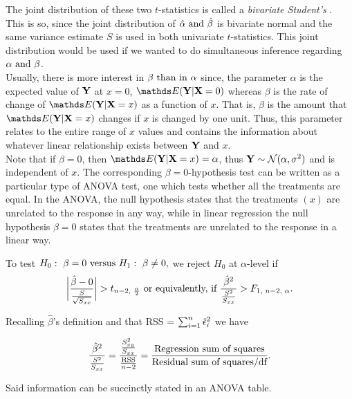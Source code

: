 \documentclass{homework}
\begin{document}
The joint distribution of these two $t$-statistics is called a \textit{bivariate Student's \tdis}. This is so, since the joint distribution of $\hat \alpha \textnormal{ and } \hat \beta$ is bivariate normal and the same variance estimate $S$ is used in both univariate $t$-statistics. This joint distribution would be used if we wanted to do simultaneous inference regarding $\alpha \textnormal{ and } \beta$. \\

Usually, there is more interest in $\beta \textnormal{ than in } \alpha$ since, the parameter $\alpha$ is the expected value of ${\bf Y}$ at $x = 0$, $\E(\Y | \X = 0)$ whereas $\beta$ is the rate of change of $\E(\Y | \X = x)$ as a function of $x$. That is, $\beta$ is the amount that $\E(\Y | \X = x)$ changes if $x$ is changed by one unit. Thus, this parameter relates to the entire range of $x$ values and contains the information about whatever linear relationship exists between ${\bf Y}$ and $x$. \\

Note that if $\beta = 0$, then $\E(\Y | \X = x) = \alpha$, thus ${\bf Y} \sim \mathcal{N}(\alpha, \sigma^2)$ and is independent of $x$. The corresponding $\beta = 0$-hypothesis test can be written as a particular type of ANOVA test, one which tests whether all the treatments are equal. In the ANOVA, the null hypothesis states that the treatments $(x)$ are unrelated to the response in any way, while in linear regression the null hypothesis $\beta = 0$ states that the treatments are unrelated to the response in a linear way. 

To test $H_0: \textnormal{ } \beta = 0 \textnormal{ versus } H_1: \textnormal{ } \beta \neq 0, $ we reject $H_0$ at $\alpha$-level if 
\begin{align*}
\bigg|\frac{\hat{\beta} - 0}{\frac{S}{\sqrt{S_{xx}}}}\bigg| > t_{n-2, \textnormal{ } \frac{\alpha}{2}} \textnormal{ or equivalently, if } \frac{\hat{\beta}^2}{\frac{S^2}{S_{xx}}} > F_{1, \textnormal{ } n-2, \textnormal{ } \alpha}.
\end{align*}

Recalling $\hat{\beta}$'s definition and that RSS = $\sum_{i=1}^{n} \hat{\epsilon}_i^2$ we have

$$
\frac{\hat{\beta}^2}{\frac{S^2}{S_{xx}}} = \frac{\frac{S_{xy}^2}{S_{xx}}}{\frac{\textnormal{RSS}}{n-2}} = \frac{\textnormal{Regression sum of squares}}{\textnormal{Residual sum of squares/df}}.
$$

Said information can be succinctly stated in an ANOVA table.
\end{document}
